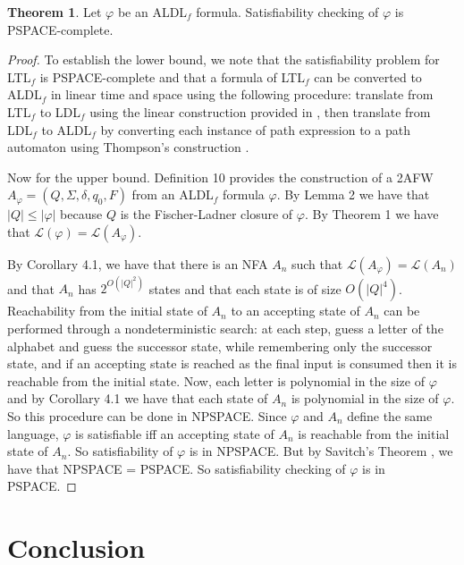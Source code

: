 \documentclass[10pt,a4paper]{amsart}
\theoremstyle{plain}
\theoremstyle{definition}
\newtheorem{theorem}[thm]{Theorem}
\theoremstyle{definition}
\DeclareMathOperator{\?}{?}
\begin{document}
\begin{theorem}
Let $\varphi$ be an ALDL$_f$ formula. Satisfiability checking of $\varphi$ is PSPACE-complete.
\end{theorem}



\begin{proof}
To establish the lower bound, we note that the satisfiability problem for LTL$_f$ is PSPACE-complete and that a formula of LTL$_f$ can be converted to ALDL$_f$ in linear time and space using the following procedure: translate from LTL$_f$ to LDL$_f$ using the linear construction provided in \cite{ldlf}, then translate from LDL$_f$ to ALDL$_f$ by converting each instance of path expression to a path automaton using Thompson's construction \cite{thompson}.

Now for the upper bound. Definition 10 provides the construction of a 2AFW $A_{\varphi} = (Q, \Sigma, \delta, q_0, F)$ from an ALDL$_f$ formula $\varphi$. By Lemma 2 we have that $|Q| \leq |\varphi|$ because $Q$ is the Fischer-Ladner closure of $\varphi$. By Theorem 1 we have that $\mathcal{L}(\varphi) = \mathcal{L}(A_\varphi)$.

By Corollary 4.1, we have that there is an NFA $A_n$ such that $\mathcal{L}(A_{\varphi}) = \mathcal{L}(A_n)$ and that $A_n$ has $2^{O(|Q|^2)}$ states and that each state is of size $O(|Q|^4)$. Reachability from the initial state of $A_n$ to an accepting state of $A_n$ can be performed through a nondeterministic search: at each step, guess a letter of the alphabet and guess the successor state, while remembering only the successor state, and if an accepting state is reached as the final input is consumed then it is reachable from the initial state. Now, each letter is polynomial in the size of $\varphi$ and by Corollary 4.1 we have that each state of $A_n$ is polynomial in the size of $\varphi$. So this procedure can be done in NPSPACE. Since $\varphi$ and $A_n$ define the same language, $\varphi$ is satisfiable iff an accepting state of $A_n$ is reachable from the initial state of $A_n$. So satisfiability of $\varphi$ is in NPSPACE. But by Savitch's Theorem \cite{savitch}, we have that NPSPACE = PSPACE. So satisfiability checking of $\varphi$ is in PSPACE.
\end{proof}


\section{Conclusion}
\end{document}

